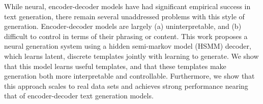 While neural, encoder-decoder models have had significant empirical success in text generation, there remain several unaddressed problems with this style of generation. Encoder-decoder models are largely (a) uninterpretable, and (b) difficult to control in terms of their phrasing or content. This work proposes a neural generation system using a hidden semi-markov model (HSMM) decoder, which learns latent, discrete templates jointly with learning to generate. We show that this model learns useful templates, and that these templates make generation both more interpretable and controllable. Furthermore, we show that this approach scales to real data sets and achieves strong performance nearing that of encoder-decoder text generation models.
